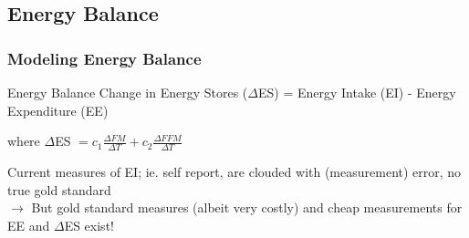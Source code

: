 \documentclass[handout]{beamer}\usepackage[]{graphicx}\usepackage[]{color}
\begin{document}
\subsection{Energy Balance}
\begin{frame}
\frametitle{Modeling Energy Balance}

\begin{block}{Energy Balance}
Change in Energy Stores ($\Delta$ES) = Energy Intake (EI) - Energy Expenditure (EE)
\end{block}

where $\Delta$ES $= c_1 \frac{\Delta FM}{\Delta T } + c_2 \frac{\Delta FFM}{\Delta T}$  



\vspace{0.3cm}


Current measures of EI; ie. self report, are clouded with (measurement) error, no true gold standard \\

$\rightarrow$ But gold standard measures (albeit very costly) and cheap measurements for EE and $\Delta$ES exist! 


\end{frame}

% 
% 
% 
% 
% 
\end{document}
